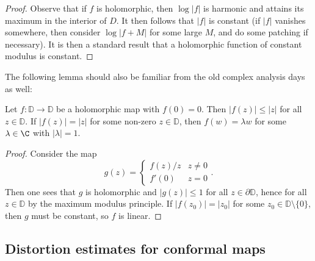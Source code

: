 \documentclass[a4paper]{article}
\renewcommand\D{\mathbb{D}}
\begin{document}
\begin{proof}
  Observe that if $f$ is holomorphic, then $\log |f|$ is harmonic and attains its maximum in the interior of $D$. It then follows that $|f|$ is constant (if $|f|$ vanishes somewhere, then consider $\log |f + M|$ for some large $M$, and do some patching if necessary). It is then a standard result that a holomorphic function of constant modulus is constant.
\end{proof}

The following lemma should also be familiar from the old complex analysis days as well:
\begin{lemma}
  Let $f: \D \to \D$ be a holomorphic map with $f(0) = 0$. Then $|f(z)| \leq |z|$ for all $z \in \D$. If $|f(z)| = |z|$ for some non-zero $z \in \D$, then $f(w) = \lambda w$ for some $\lambda \in \C$ with $|\lambda| = 1$.
\end{lemma}

\begin{proof}
  Consider the map
  \[
   g(z) =
    \begin{cases}
      f(z)/z & z \not =0\\
      f'(0) & z = 0
    \end{cases}.
  \]
  Then one sees that $g$ is holomorphic and $|g(z)| \leq 1$ for all $z \in \partial\D$, hence for all $z \in \D$ by the maximum modulus principle. If $|f(z_0)| = |z_0|$ for some $z_0 \in \D \setminus \{0\}$, then $g$ must be constant, so $f$ is linear.
\end{proof}

\subsection{Distortion estimates for conformal maps}
\end{document}
